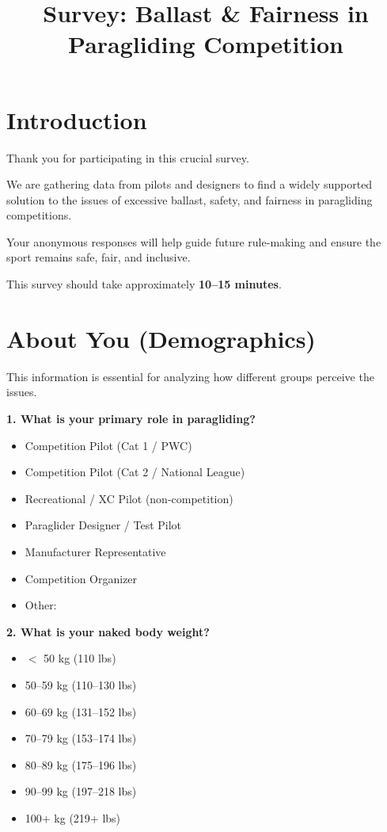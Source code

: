 \documentclass[11pt,a4paper]{article}
\title{\textbf{Survey: Ballast \& Fairness in Paragliding Competition}}
\author{}
\date{}
\begin{document}
\maketitle

\section*{Introduction}

Thank you for participating in this crucial survey.

We are gathering data from pilots and designers to find a widely supported solution to the issues of excessive ballast, safety, and fairness in paragliding competitions.

Your anonymous responses will help guide future rule-making and ensure the sport remains safe, fair, and inclusive.

This survey should take approximately \textbf{10--15 minutes}.

\section{About You (Demographics)}

This information is essential for analyzing how different groups perceive the issues.

\textbf{1. What is your primary role in paragliding?}
\begin{itemize}[label=$\square$]
    \item Competition Pilot (Cat 1 / PWC)
    \item Competition Pilot (Cat 2 / National League)
    \item Recreational / XC Pilot (non-competition)
    \item Paraglider Designer / Test Pilot
    \item Manufacturer Representative
    \item Competition Organizer
    \item Other: \underline{\hspace{3cm}}
\end{itemize}

\textbf{2. What is your naked body weight?}
\begin{itemize}[label=$\square$]
    \item $<$ 50 kg (110 lbs)
    \item 50--59 kg (110--130 lbs)
    \item 60--69 kg (131--152 lbs)
    \item 70--79 kg (153--174 lbs)
    \item 80--89 kg (175--196 lbs)
    \item 90--99 kg (197--218 lbs)
    \item 100+ kg (219+ lbs)
\end{itemize}
\end{document}
